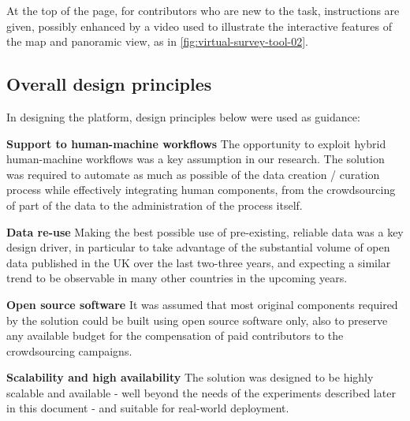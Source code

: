At the top of the page, for contributors who are new to the task, instructions are given, possibly enhanced by a video used to illustrate the interactive features of the map and panoramic view, as in \ref{fig:virtual-survey-tool-02}.

\begin{figure}[!ht]
    \begin{floatrow}
   \end{floatrow}
\end{figure}

\subsection{Overall design principles}

In designing the platform, design principles below were used as guidance:

\textbf{Support to human-machine workflows} The opportunity to exploit hybrid human-machine workflows was a key assumption in our research. The solution was required to automate as much as possible of the data creation / curation process while effectively integrating human components, from the crowdsourcing of part of the data to the administration of the process itself.

\textbf{Data re-use} Making the best possible use of pre-existing, reliable data was a key design driver, in particular to take advantage of the substantial volume of open data published in the UK over the last two-three years, and expecting a similar trend to be observable in many other countries in the upcoming years.

\textbf{Open source software} It was assumed that most original components required by the solution could be built using open source software only, also to preserve any available budget for the compensation of paid contributors to the crowdsourcing campaigns.

\textbf{Scalability and high availability} The solution was designed to be highly scalable and available - well beyond the needs of the experiments described later in this document - and suitable for real-world deployment.

